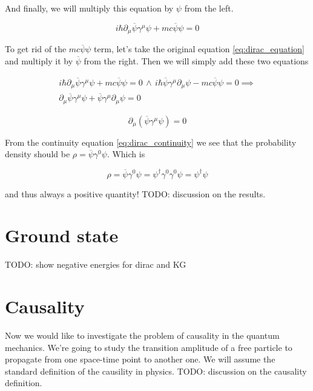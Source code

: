 And finally, we will multiply this equation by $\psi$ from the left.

\begin{equation}
    i \hbar \partial_{\mu} \overline{\psi} \gamma^{\mu} \psi + mc \overline{\psi} \psi = 0
\end{equation}

To get rid of the $mc \overline{\psi} \psi$ term, let's take the original equation \ref{eq:dirac_equation} and multiply it
by $\overline{\psi}$ from the right. Then we will simply add these two equations

\begin{equation*}
    \begin{gathered}
        i \hbar \partial_{\mu} \overline{\psi} \gamma^{\mu} \psi + mc \overline{\psi} \psi = 0 \, \land \,
        i \hbar \overline{\psi} \gamma^{\mu} \partial_{\mu} \psi - mc \overline{\psi} \psi = 0 \implies \\
        \partial_{\mu} \overline{\psi} \gamma^{\mu} \psi + \overline{\psi} \gamma^{\mu} \partial_{\mu} \psi = 0
    \end{gathered}
\end{equation*}

\begin{equation}
    \label{eq:dirac_continuity}
    \partial_{\mu} (\overline{\psi} \gamma^{\mu} \psi) = 0
\end{equation}

From the continuity equation \ref{eq:dirac_continuity} we see that the probability density should be $\rho = \overline{\psi} \gamma^{0} \psi$.
Which is

\begin{equation*}
    \rho = \overline{\psi} \gamma^{0} \psi = \psi^{\dagger} \gamma^{0} \gamma^{0} \psi = \psi^{\dagger} \psi
\end{equation*}

and thus always a positive quantity! TODO: discussion on the results.

\section{Ground state}

TODO: show negative energies for dirac and KG

\section{Causality}

Now we would like to investigate the problem of causality in the quantum mechanics. We're going to study the transition
amplitude of a free particle to propagate from one space-time point to another one. We will assume the standard definition
of the causility in physics. TODO: discussion on the causality definition.

